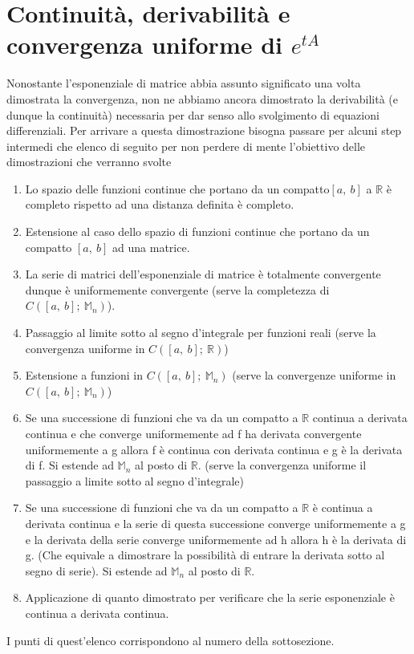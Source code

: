 \documentclass[10pt,a4paper]{article}
\begin{document}
\section{Continuità, derivabilità e convergenza uniforme di \(e^{tA}\)}
Nonostante l'esponenziale di matrice abbia assunto significato una volta dimostrata la convergenza, non ne abbiamo ancora dimostrato la derivabilità (e dunque la continuità) necessaria per dar senso allo svolgimento di equazioni differenziali. Per arrivare a questa dimostrazione bisogna passare per alcuni step intermedi che elenco di seguito per non perdere di mente l'obiettivo delle dimostrazioni che verranno svolte
\begin{enumerate}
	\item Lo spazio delle funzioni continue che portano da un compatto\( [a,\ b]\) a \(\mathbb{R}\) è completo rispetto ad una distanza definita è completo. 
	\item Estensione al caso dello spazio di funzioni continue che portano da un compatto \([a,\ b]\) ad una matrice.
	\item La serie di matrici dell'esponenziale di matrice è totalmente convergente dunque è uniformemente convergente (serve la completezza di \(C([a,\ b];\ \mathbb{M}_n)\)). 
	\item Passaggio al limite sotto al segno d'integrale per funzioni reali (serve la convergenza uniforme in \(C([a,\ b];\ \mathbb{R})\))
	\item Estensione a funzioni in \(C([a,\ b];\ \mathbb{M}_n)\) (serve la convergenze uniforme in \(C([a,\ b];\ \mathbb{M}_n)\))
	\item Se una successione di funzioni che va da un compatto a $\mathbb{R}$ continua a derivata continua e che converge uniformemente ad f ha derivata convergente uniformemente a g allora f è continua con derivata continua e g è la derivata di f. Si estende ad \(\mathbb{M}_n\) al posto di \(\mathbb{R}\). (serve la convergenza uniforme il passaggio a limite sotto al segno d'integrale) 
	\item Se una successione di funzioni che va da un compatto a $\mathbb{R}$  è continua a derivata continua e la serie di questa successione converge uniformemente a g e la derivata della serie converge uniformemente ad h allora h è la derivata di g. (Che equivale a dimostrare la possibilità di entrare la derivata sotto al segno di serie). Si estende ad \(\mathbb{M}_n\) al posto di \(\mathbb{R}\).
	\item Applicazione di quanto dimostrato per verificare che la serie esponenziale è continua a derivata continua. 
\end{enumerate}
I punti di quest'elenco corrispondono al numero della sottosezione.
\end{document}
